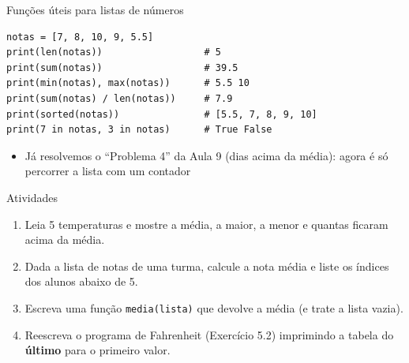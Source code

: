 \documentclass[aspectratio=169,10pt,t]{beamer}
\begin{document}
\begin{frame}[fragile]{Funções úteis para listas de números}
\begin{lstlisting}
notas = [7, 8, 10, 9, 5.5]
print(len(notas))                  # 5
print(sum(notas))                  # 39.5
print(min(notas), max(notas))      # 5.5 10
print(sum(notas) / len(notas))     # 7.9
print(sorted(notas))               # [5.5, 7, 8, 9, 10]
print(7 in notas, 3 in notas)      # True False
\end{lstlisting}
  \begin{itemize}
    \item Já resolvemos o ``Problema 4'' da Aula 9 (dias acima da média): agora é só percorrer a lista com um contador
  \end{itemize}
\end{frame}

\begin{frame}{Atividades}
  \begin{enumerate}
    \item Leia 5 temperaturas e mostre a média, a maior, a menor e quantas ficaram acima da média.
    \item Dada a lista de notas de uma turma, calcule a nota média e liste os índices dos alunos abaixo de 5.
    \item Escreva uma função \texttt{media(lista)} que devolve a média (e trate a lista vazia).
    \item Reescreva o programa de Fahrenheit (Exercício 5.2) imprimindo a tabela do \textbf{último} para o primeiro valor.
  \end{enumerate}
\end{frame}


\end{document}
